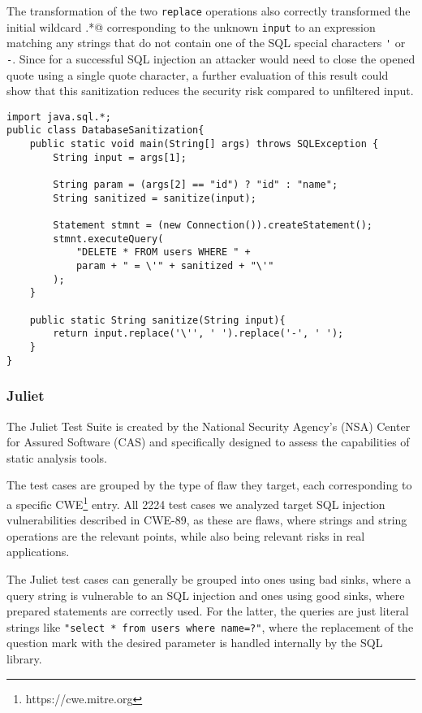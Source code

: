 The transformation of the two \lstinline|replace| operations also correctly transformed the initial wildcard \Verb@.*@ corresponding to the unknown \lstinline|input| to an expression matching any strings that do not contain one of the SQL special characters \lstinline|'| or \lstinline|-|. Since for a successful SQL injection an attacker would need to close the opened quote using a single quote character, a further evaluation of this result could show that this sanitization reduces the security risk compared to unfiltered input.

\begin{lstlisting}[float, escapechar=|, numbers=right, caption=SQL query sanitization example, label=lst:sqlSanit, captionpos=b, basicstyle=\small\ttfamily]
import java.sql.*;
public class DatabaseSanitization{
	public static void main(String[] args) throws SQLException {
		String input = args[1];
		
		String param = (args[2] == "id") ? "id" : "name";
		String sanitized = sanitize(input);
		
		Statement stmnt = (new Connection()).createStatement();
		stmnt.executeQuery(
			"DELETE * FROM users WHERE " + 
			param + " = \'" + sanitized + "\'"
		);
	}
	
	public static String sanitize(String input){
		return input.replace('\'', ' ').replace('-', ' ');
	}
}
\end{lstlisting}

\subsubsection{Juliet}

The Juliet Test Suite is created by the National Security Agency’s (NSA) Center for Assured Software (CAS) and specifically designed to assess the capabilities of static analysis tools.

The test cases are grouped by the type of flaw they target, each corresponding to a specific CWE\footnote{https://cwe.mitre.org} entry. All 2224 test cases we analyzed target SQL injection vulnerabilities described in CWE-89, as these are flaws, where strings and string operations are the relevant points, while also being relevant risks in real applications.

The Juliet test cases can generally be grouped into ones using bad sinks, where a query string is vulnerable to an SQL injection and ones using good sinks, where prepared statements are correctly used. For the latter, the queries are just literal strings like \lstinline|"select * from users where name=?"|, where the replacement of the question mark with the desired parameter is handled internally by the SQL library.

